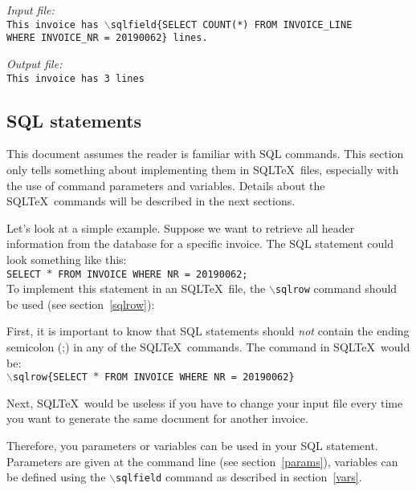 \documentclass{article}
\newcommand{\bs}{\ensuremath{\backslash}}
\newcommand{\vs}{\vspace{3mm}}
\begin{document}
\begin{minipage}[t]{0.5\textwidth}\textsl{Input file:}\\\texttt{\footnotesize{This invoice has \bs sqlfield\{SELECT COUNT(*) FROM INVOICE\_LINE \\
WHERE INVOICE\_NR = 20190062\} lines.\\
\hrulefill}}\end{minipage}\hfill\begin{minipage}[t]{0.5\textwidth}\textsl{Output file:}\\\texttt{\footnotesize{This invoice has 3 lines \\
}}\end{minipage}

\subsection{SQL statements}\label{sqlstatements}

This document assumes the reader is familiar with SQL commands. This section only tells something about
implementing them in SQL\TeX\ files, especially with the use of command parameters and variables.
Details about the SQL\TeX\ commands will be described in the next sections.

\vs

Let's look at a simple example. Suppose we want to retrieve all header information from the database
for a specific invoice. The SQL statement could look something like this: \\
\texttt{SELECT $\ast$ FROM INVOICE WHERE NR = 20190062;}\\
To implement this statement in an SQL\TeX\ file, the \texttt{\bs sqlrow} command should be used (see
section~\ref{sqlrow}):

First, it is important to know that SQL statements should \textit{not} contain the ending semicolon (;) in
any of the SQL\TeX\ commands. The command in SQL\TeX\ would be:\\
\texttt{\bs sqlrow\{SELECT $\ast$ FROM INVOICE WHERE NR = 20190062\}}

Next, SQL\TeX\ would be useless if you have to change your input file every time you want to generate
the same document for another invoice.

\vs

Therefore, you parameters or variables can be used in your SQL statement. Parameters are given at the command
line (see section~\ref{params}), variables can be defined using the \texttt{\bs sqlfield} command as
described in section~\ref{vars}.
\end{document}
